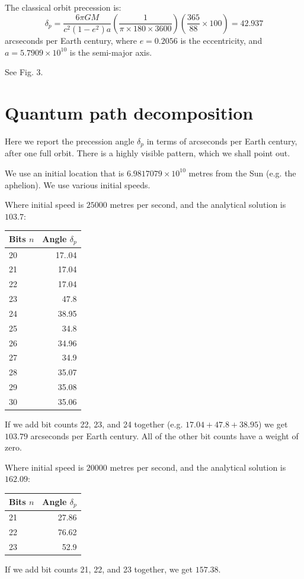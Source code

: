 \documentclass[12pt]{article}
\begin{document}
The classical orbit precession is:
\begin{equation}
\label{delta_p}
\delta_{p} = \frac{6 \pi G M}{c^2 (1 - e^2) a} \left( \frac{1}{ \pi \times 180 \times 3600} \right) \left( \frac{365}{88} \times 100 \right) = 42.937
\end{equation}
arcseconds per Earth century, where $e = 0.2056$ is the eccentricity, and $a = 5.7909 \times 10^{10}$ is the semi-major axis.

See Fig. 3.


\section{Quantum path decomposition}

Here we report the precession angle $\delta_{p}$ in terms of arcseconds per Earth century, after one full orbit.
There is a highly visible pattern, which we shall point out.

We use an initial location that is $6.9817079 \times 10^{10}$ metres from the Sun (e.g. the aphelion).
We use various initial speeds.

Where initial speed is $25000$ metres per second, and the analytical solution is $103.7$:
\begin{center}
\begin{tabular}{| l | r |}
  \hline
Bits $n$ & Angle $\delta_{p}$ \\
\hline
\hline
20 & 17..04 \\
21 & 17.04 \\
22 & 17.04 \\
23 & 47.8 \\
24 & 38.95 \\
25 & 34.8 \\
26 & 34.96 \\
27 & 34.9 \\
28 & 35.07 \\
29 & 35.08 \\
30 & 35.06 \\
  \hline  
\end{tabular}
\end{center}
If we add bit counts 22, 23, and 24 together (e.g. $17.04 + 47.8 + 38.95$) we get $103.79$ arcseconds per Earth century.
All of the other bit counts have a weight of zero.

Where initial speed is $20000$ metres per second, and the analytical solution is $162.09$:
\begin{center}
\begin{tabular}{| l | r |}
  \hline
Bits $n$ & Angle $\delta_{p}$\\
\hline
\hline
21 & 27.86 \\
22 & 76.62 \\
23 & 52.9 \\
  \hline  
\end{tabular}
\end{center}
If we add bit counts 21, 22, and 23 together, we get $157.38$.
\end{document}
